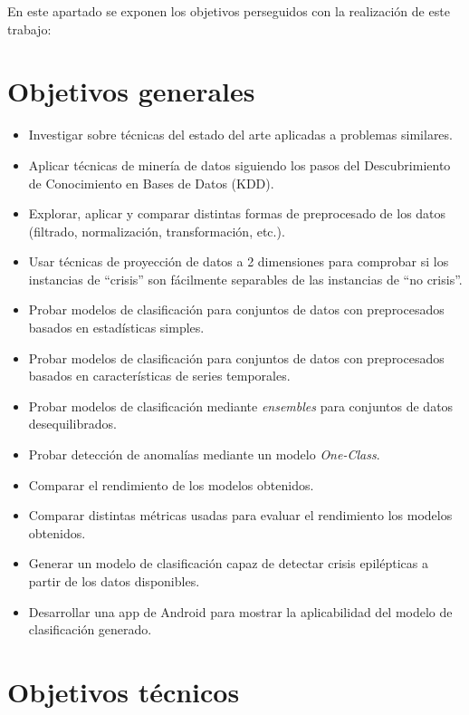 
En este apartado se exponen los objetivos perseguidos con la realización de este trabajo: 

\section{Objetivos generales}

\begin{itemize}
	\item Investigar sobre técnicas del estado del arte aplicadas a problemas similares. 
	\item Aplicar técnicas de minería de datos siguiendo los pasos del Descubrimiento de Conocimiento en Bases de Datos (KDD).
	\item Explorar, aplicar y comparar distintas formas de preprocesado de los datos (filtrado, normalización, transformación, etc.). 
	\item Usar técnicas de proyección de datos a 2 dimensiones para comprobar si los instancias de ``crisis'' son fácilmente separables de las instancias de ``no crisis''. 
	\item Probar modelos de clasificación para conjuntos de datos con preprocesados basados en estadísticas simples.
	\item Probar modelos de clasificación para conjuntos de datos con preprocesados basados en características de series temporales.  
	\item Probar modelos de clasificación mediante \textit{ensembles} para conjuntos de datos desequilibrados. 
	\item Probar detección de anomalías mediante un modelo \textit{One-Class}.
	\item Comparar el rendimiento de los modelos obtenidos. 
	\item Comparar distintas métricas usadas para evaluar el rendimiento los modelos obtenidos. 
	\item Generar un modelo de clasificación capaz de detectar crisis epilépticas a partir de los datos disponibles. 
	\item Desarrollar una app de Android para mostrar la aplicabilidad del modelo de clasificación generado. 
\end{itemize}

\section{Objetivos técnicos}


